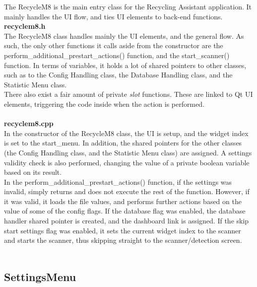 \documentclass[conference]{IEEEtran}
\begin{document}
The RecycleM8 is the main entry class for the Recycling Assistant application. It mainly handles the UI flow, and ties UI elements to back-end functions.\\


\textbf{recyclem8.h}~\\

The RecycleM8 class handles mainly the UI elements, and the general flow. As such, the only other functions it calls aside from the constructor are the perform\_additional\_prestart\_actions() function, and the start\_scanner() function. In terms of variables, it holds a lot of shared pointers to other classes, such as to the Config Handling class, the Database Handling class, and the Statistic Menu class.\\

There also exist a fair amount of private \textit{slot} functions. These are linked to Qt UI elements, triggering the code inside when the action is performed. ~\\~\\


\textbf{recyclem8.cpp}~\\

In the constructor of the RecycleM8 class, the UI is setup, and the widget index is set to the start\_menu. In addition, the shared pointers for the other classes (the Config Handling class, and the Statistic Menu class) are assigned. A settings validity check is also performed, changing the value of a private boolean variable based on its result.\\


In the perform\_additional\_prestart\_actions() function, if the settings was invalid, simply returns and does not execute the rest of the function. However, if it was valid, it loads the file values, and performs further actions based on the value of some of the config flags. If the database flag was enabled, the database handler shared pointer is created, and the dashboard link is assigned. If the skip start settings flag was enabled, it sets the current widget index to the scanner and starts the scanner, thus skipping straight to the scanner/detection screen.~\\~\\

\subsection{SettingsMenu}
\end{document}
